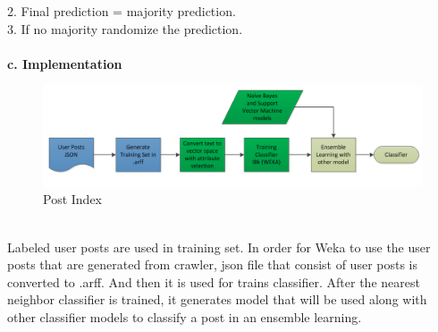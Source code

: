 		   2. Final prediction = majority prediction.\\
		   3. If no majority randomize the prediction.\\\\
	\textbf{c. Implementation} \\
	\begin{figure}[h]
		\begin{center}
			\includegraphics[scale=0.55]{images/Nearest.png}
		\caption{Post Index\label{Nearest}}
		\end{center}
	\end{figure}
	\\Labeled user posts are used in training set. In order for Weka to use the user posts that are generated from crawler, json file that consist of user posts is converted to .arff. And then it is used for trains classifier. After the nearest neighbor classifier is trained, it generates model that will be used along with other classifier models to classify a post in an ensemble learning.\
